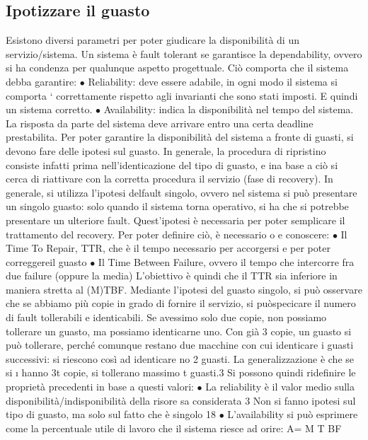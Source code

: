 \subsection{Ipotizzare il guasto}
Esistono diversi parametri per poter giudicare la disponibilità di un servizio/sistema.
Un sistema è fault tolerant se garantisce la dependability, ovvero si ha condenza
per qualunque aspetto progettuale. Ciò comporta che il sistema debba garantire:
$\bullet$ Reliability: deve essere adabile, in ogni modo il sistema si comporta
`
correttamente rispetto agli invarianti che sono stati imposti. E quindi un
sistema corretto.
$\bullet$ Availability: indica la disponibilità nel tempo del sistema. La risposta da
parte del sistema deve arrivare entro una certa deadline prestabilita.
Per poter garantire la disponibilità del sistema a fronte di guasti, si devono fare
delle ipotesi sul guasto. In generale, la procedura di ripristino consiste infatti
prima nell'identicazione del tipo di guasto, e ina base a ciò si cerca di riattivare
con la corretta procedura il servizio (fase di recovery).
In generale, si utilizza l'ipotesi delfault singolo, ovvero nel sistema si può
presentare un singolo guasto: solo quando il sistema torna operativo, si ha che
si potrebbe presentare un ulteriore fault. Quest'ipotesi è necessaria per poter
semplicare il trattamento del recovery. Per poter definire ciò, è necessario
o e
conoscere:
$\bullet$ Il Time To Repair, TTR, che è il tempo necessario per accorgersi e per
poter correggereil guasto
$\bullet$ Il Time Between Failure, ovvero il tempo che intercorre fra due failure
(oppure la media)
L'obiettivo è quindi che il TTR sia inferiore in maniera stretta al (M)TBF.
Mediante l'ipotesi del guasto singolo, si può osservare che se abbiamo più copie
in grado di fornire il servizio, si puòspecicare il numero di fault tollerabili e
identicabili. Se avessimo solo due copie, non possiamo tollerare un guasto,
ma possiamo identicarne uno. Con già 3 copie, un guasto si può tollerare,
perché comunque restano due macchine con cui identicare i guasti successivi:
si riescono così ad identicare no 2 guasti. La generalizzazione è che se si
\i{}
hanno 3t copie, si tollerano massimo t guasti.3 Si possono quindi ridefinire le
proprietà precedenti in base a questi valori:
$\bullet$ La reliability è il valor medio sulla disponibilità/indisponibilità della risore
sa considerata
3 Non
si fanno ipotesi sul tipo di guasto, ma solo sul fatto che è singolo
18
$\bullet$ L'availability si può esprimere come la percentuale utile di lavoro che il
sistema riesce ad orire:
A=
M T BF
